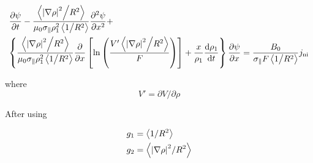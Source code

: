 \[\begin{gathered}
  \frac{{\partial \psi }}{{\partial t}} - \frac{{\left\langle {{{{{\left| {\nabla \rho } \right|}^2}} \mathord{\left/
 {\vphantom {{{{\left| {\nabla \rho } \right|}^2}} {{R^2}}}} \right.
 \kern-\nulldelimiterspace} {{R^2}}}} \right\rangle }}{{{\mu _0}{\sigma _\parallel }\rho _{{\text{1}}}^2\left\langle {{1 \mathord{\left/
 {\vphantom {1 {{R^2}}}} \right.
 \kern-\nulldelimiterspace} {{R^2}}}} \right\rangle }}\frac{{{\partial ^2}\psi }}{{\partial {x^2}}} +  \hfill \\
  \left\{ {\frac{{\left\langle {{{{{\left| {\nabla \rho } \right|}^2}} \mathord{\left/
 {\vphantom {{{{\left| {\nabla \rho } \right|}^2}} {{R^2}}}} \right.
 \kern-\nulldelimiterspace} {{R^2}}}} \right\rangle }}{{{\mu _0}{\sigma _\parallel }\rho _{{\text{1}}}^2\left\langle {{1 \mathord{\left/
 {\vphantom {1 {{R^2}}}} \right.
 \kern-\nulldelimiterspace} {{R^2}}}} \right\rangle }}\frac{\partial }{{\partial x}}\left[ {\ln \left( {\frac{{V'\left\langle {{{{{\left| {\nabla \rho } \right|}^2}} \mathord{\left/
 {\vphantom {{{{\left| {\nabla \rho } \right|}^2}} {{R^2}}}} \right.
 \kern-\nulldelimiterspace} {{R^2}}}} \right\rangle }}{F}} \right)} \right] + \frac{x}{{{\rho _{{\text{1}}}}}}\frac{{{\text{d}}{\rho _{{\text{1}}}}}}{{{\text{d}}t}}} \right\}\frac{{\partial \psi }}{{\partial x}} = \frac{{{B_0}}}{{{\sigma _\parallel }F\left\langle {{1 \mathord{\left/
 {\vphantom {1 {{R^2}}}} \right.
 \kern-\nulldelimiterspace} {{R^2}}}} \right\rangle }}{j_{{\text{ni}}}} \hfill \\ 
\end{gathered} \]

where
\[V' = \partial V/\partial \rho \]

After using

\[\begin{gathered}
  {g_1} = \left\langle {1/{R^2}} \right\rangle  \hfill \\
  {g_2} = \left\langle {{{\left| {\nabla \rho } \right|}^2}/{R^2}} \right\rangle  \hfill \\ 
\end{gathered} \]


